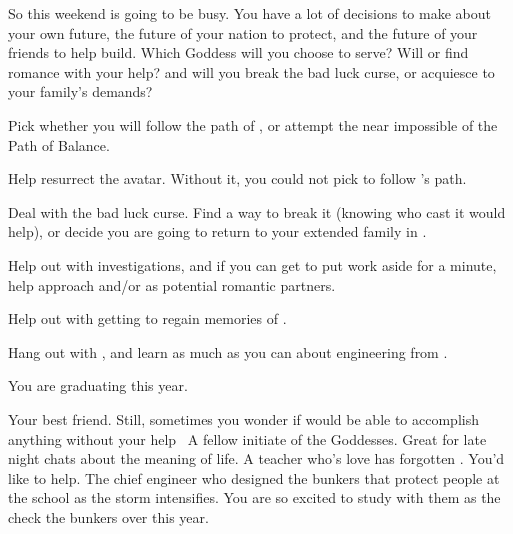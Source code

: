 \documentclass[char]{GL2020}
\begin{document}
So this weekend is going to be busy. You have a lot of decisions to make about your own future, the future of your nation to protect, and the future of your friends to help build. Which Goddess will you choose to serve? Will \cPresident{} or \cChupAvenger{} find romance with your help? and will you break the bad luck curse, or acquiesce to your \pFarm{} family's demands?

\begin{itemz}[Goals]
	\item Pick whether you will follow the path of \cEbb{\full}, \cFlow{\full} or attempt the near impossible of the Path of Balance.
	\item Help resurrect the \cEbb{} avatar. Without it, you could not pick to follow \cEbb{}'s path.
	\item Deal with the bad luck curse. Find a way to break it (knowing who cast it would help), or decide you are going to return to your extended family in \pFarm{}.
	\item Help \cPresident{} out with \cPresident{\their} investigations, and if you can get \cPresident{\them} to put work aside for a minute, help \cPresident{\them} approach \cHeir{} and/or \cChupStudent{} as potential romantic partners.
	\item Help \cChupAvenger{} out with getting \cHeadScientist{} to regain \cHeadScientist{\their} memories of \cChupAvenger{}.
	\item Hang out with \cBunker{}, and learn as much as you can about engineering from \cBunker{\them}.
\end{itemz}

\begin{itemz}[Notes]
	\item You are graduating this year.
\end{itemz}

\begin{contacts}
	\contact{\cPresident{}} Your best friend. Still, sometimes you wonder if \cPresident{\they} would be able to accomplish anything without your help\
	\contact{\cWarlordDaughter{}} A fellow initiate of the Goddesses. Great for late night chats about the meaning of life.
	\contact{\cChupAvenger{}} A teacher who's love has forgotten \cChupAvenger{\them}. You'd like to help.
	\contact{\cBunker{}} The chief engineer who designed the bunkers that protect people at the school as the storm intensifies. You are so excited to study with them as the check the bunkers over this year.
\end{contacts}
\end{document}
